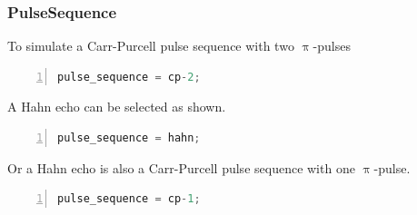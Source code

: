 \documentclass{book}
\begin{document}
\subsubsection{PulseSequence} %
To simulate a Carr-Purcell pulse sequence with two $\uppi$-pulses   
\begin{lstlisting}[frame=single,numbers=left,language=c]
pulse_sequence = cp-2;
\end{lstlisting}
A Hahn echo can be selected as shown. 
\begin{lstlisting}[frame=single,numbers=left,language=c]
pulse_sequence = hahn;
\end{lstlisting}
Or a Hahn echo is also a Carr-Purcell pulse sequence with one $\uppi$-pulse.
\begin{lstlisting}[frame=single,numbers=left,language=c]
pulse_sequence = cp-1;
\end{lstlisting}
 
\end{document}
